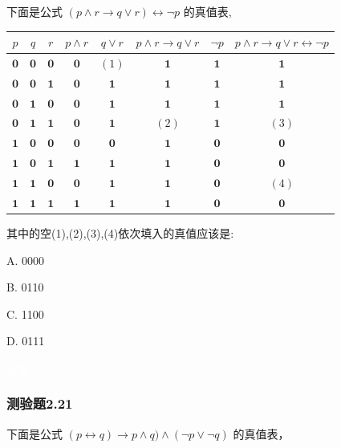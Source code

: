 \documentclass[UTF8, heading=true]{ctexart}
\begin{document}
下面是公式 $(p \wedge r \rightarrow q \vee r) \leftrightarrow \neg p$ 的真值表,
\begin{table}[H]
  \centering
\begin{tabular}{c|c|c|c|c|c|c|c}
\hline$p$ & $q$ & $r$ & $p \wedge r$ & $q \vee r$ & $p \wedge r \rightarrow q \vee r$ & $\neg p$ & $p \wedge r \rightarrow q \vee r \leftrightarrow \neg p$ \\
\hline $\mathbf{0}$ & $\mathbf{0}$ & $\mathbf{0}$ & $\mathbf{0}$ & $(1)$ & $\mathbf{1}$ & $\mathbf{1}$ & $\mathbf{1}$ \\
\hline $\mathbf{0}$ & $\mathbf{0}$ & $\mathbf{1}$ & $\mathbf{0}$ & $\mathbf{1}$ & $\mathbf{1}$ & $\mathbf{1}$ & $\mathbf{1}$ \\
\hline $\mathbf{0}$ & $\mathbf{1}$ & $\mathbf{0}$ & $\mathbf{0}$ & $\mathbf{1}$ & $\mathbf{1}$ & $\mathbf{1}$ & $\mathbf{1}$ \\
\hline $\mathbf{0}$ & $\mathbf{1}$ & $\mathbf{1}$ & $\mathbf{0}$ & $\mathbf{1}$ & $(2)$ & $\mathbf{1}$ & $(3)$ \\
\hline $\mathbf{1}$ & $\mathbf{0}$ & $\mathbf{0}$ & $\mathbf{0}$ & $\mathbf{0}$ & $\mathbf{1}$ & $\mathbf{0}$ & $\mathbf{0}$ \\
\hline $\mathbf{1}$ & $\mathbf{0}$ & $\mathbf{1}$ & $\mathbf{1}$ & $\mathbf{1}$ & $\mathbf{1}$ & $\mathbf{0}$ & $\mathbf{0}$ \\
\hline $\mathbf{1}$ & $\mathbf{1}$ & $\mathbf{0}$ & $\mathbf{0}$ & $\mathbf{1}$ & $\mathbf{1}$ & $\mathbf{0}$ & $(4)$ \\
\hline $\mathbf{1}$ & $\mathbf{1}$ & $\mathbf{1}$ & $\mathbf{1}$ & $\mathbf{1}$ & $\mathbf{1}$ & $\mathbf{0}$ & $\mathbf{0}$ \\
\hline
\end{tabular}
\end{table}

其中的空(1),(2),(3),(4)依次填入的真值应该是:

A. 0000

B. 0110

C. 1100

D. 0111

\textcolor{white}{答案：B}

\subsubsection{测验题2.21}

下面是公式 $(p \leftrightarrow q) \rightarrow p \wedge q) \wedge(\neg p \vee \neg q)$ 的真值表，
\end{document}

